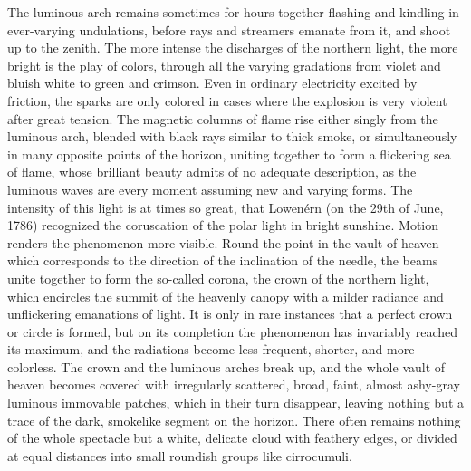 The luminous arch remains sometimes for hours together flashing and kindling in ever-varying undulations, before rays and streamers emanate from it, and shoot up to the zenith. The more intense the discharges of the northern light, the more bright is the play of colors, through all the varying gradations from violet and bluish white to green and crimson. Even in ordinary electricity excited by friction, the sparks are only colored in cases where the explosion is very violent after great tension. The magnetic columns of flame rise either singly from the luminous arch, blended with black rays similar to thick smoke, or simultaneously in many opposite points of the horizon, uniting together to form a flickering sea of flame, whose brilliant beauty admits of no adequate description, as the luminous waves are every moment assuming new and varying forms. The intensity of this light is at times so great, that Lowen\'{e}rn (on the 29th of June, 1786) recognized the coruscation of the polar light in bright sunshine. Motion renders the phenomenon more visible. Round the point in the vault of heaven which corresponds to the direction of the inclination of the needle, the beams unite together to form the so-called corona, the crown of the northern light, which encircles the summit of the heavenly canopy with a milder radiance and unflickering emanations of light. It is only in rare instances that a perfect crown or circle is formed, but on its completion the phenomenon has invariably reached its maximum, and the radiations become less frequent, shorter, and more colorless. The crown and the luminous arches break up, and the whole vault of heaven becomes covered with irregularly scattered, broad, faint, almost ashy-gray luminous immovable patches, which in their turn disappear, leaving nothing but a trace of the dark, smokelike segment on the horizon. There often remains nothing of the whole spectacle but a white, delicate cloud with feathery edges, or divided at equal distances into small roundish groups like cirrocumuli.

